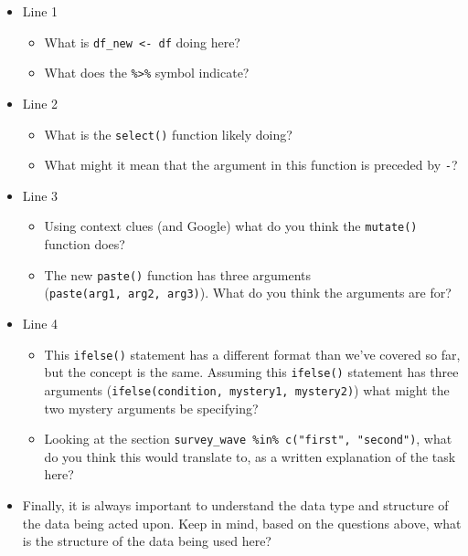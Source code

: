 \documentclass[
]{book}
\providecommand{\tightlist}{%
  \setlength{\itemsep}{0pt}\setlength{\parskip}{0pt}}
\begin{document}
\begin{itemize}
\tightlist
\item
  Line 1

  \begin{itemize}
  \tightlist
  \item
    What is \texttt{df\_new\ \textless{}-\ df} doing here?
  \item
    What does the \texttt{\%\textgreater{}\%} symbol indicate?
  \end{itemize}
\item
  Line 2

  \begin{itemize}
  \tightlist
  \item
    What is the \texttt{select()} function likely doing?
  \item
    What might it mean that the argument in this function is preceded by \texttt{-}?
  \end{itemize}
\item
  Line 3

  \begin{itemize}
  \tightlist
  \item
    Using context clues (and Google) what do you think the \texttt{mutate()} function does?
  \item
    The new \texttt{paste()} function has three arguments (\texttt{paste(arg1,\ arg2,\ arg3)}). What do you think the arguments are for?
  \end{itemize}
\item
  Line 4

  \begin{itemize}
  \tightlist
  \item
    This \texttt{ifelse()} statement has a different format than we've covered so far, but the concept is the same. Assuming this \texttt{ifelse()} statement has three arguments (\texttt{ifelse(condition,\ mystery1,\ mystery2)}) what might the two mystery arguments be specifying?
  \item
    Looking at the section \texttt{survey\_wave\ \%in\%\ c("first",\ "second")}, what do you think this would translate to, as a written explanation of the task here?
  \end{itemize}
\item
  Finally, it is always important to understand the data type and structure of the data being acted upon. Keep in mind, based on the questions above, what is the structure of the data being used here?
\end{itemize}
\end{document}

